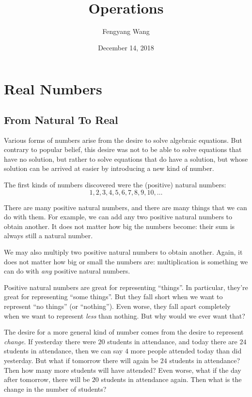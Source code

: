 \documentclass[12pt,a4paper]{report}
\title{Operations}
\author{Fengyang Wang}
\date{December 14, 2018}
\begin{document}
\maketitle

\tableofcontents

\chapter{Real Numbers}

\section{From Natural To Real}

Various forms of numbers arise from the desire to solve algebraic equations. But
contrary to popular belief, this desire was not to be able to solve equations
that have no solution, but rather to solve equations that do have a solution,
but whose solution can be arrived at easier by introducing a new kind of number.

The first kinds of numbers discovered were the (positive) natural numbers: \[ 1,
2, 3, 4, 5, 6, 7, 8, 9, 10, \dots \]

There are many positive natural numbers, and there are many things that we can
do with them. For example, we can add any two positive natural numbers to obtain
another. It does not matter how big the numbers become: their sum is always
still a natural number.

We may also multiply two positive natural numbers to obtain another. Again, it
does not matter how big or small the numbers are: multiplication is something
we can do with \emph{any} positive natural numbers.

Positive natural numbers are great for representing ``things''. In particular,
they're great for representing ``some things''. But they fall short when we want
to represent ``no things'' (or ``nothing''). Even worse, they fall apart
completely when we want to represent \emph{less} than nothing. But why would we
ever want that?

The desire for a more general kind of number comes from the desire to represent
\emph{change}. If yesterday there were $20$ students in attendance, and today
there are $24$ students in attendance, then we can say $4$ more people attended
today than did yesterday. But what if tomorrow there will again be $24$ students
in attendance? Then how many more students will have attended? Even worse, what
if the day after tomorrow, there will be $20$ students in attendance again. Then
what is the change in the number of students?
\end{document}

